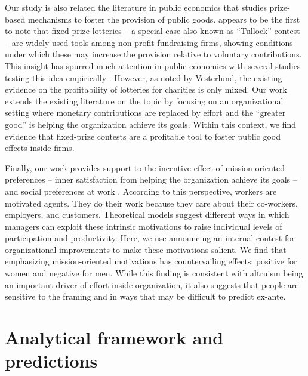\documentclass[12pt, titlepage]{article}
\begin{document}
Our study is also related the literature in public economics that
studies prize-based mechanisms to foster the provision of public goods.
\citet{morgan2000funding} appears to be the first to note that
fixed-prize lotteries -- a special case also known as ``Tullock''
contest -- are widely used tools among non-profit fundraising firms,
showing conditions under which these may increase the provision relative
to voluntary contributions. This insight has spurred much attention in
public economics with several studies testing this idea empirically
\citep[see][ for a survey]{vesterlund2012voluntary}. However, as noted
by Vesterlund, the existing evidence on the profitability of lotteries
for charities is only mixed. Our work extends the existing literature on
the topic by focusing on an organizational setting where monetary
contributions are replaced by effort and the ``greater good'' is helping
the organization achieve its goals. Within this context, we find
evidence that fixed-prize contests are a profitable tool to foster
public good effects inside firms.

Finally, our work provides support to the incentive effect of
mission-oriented preferences -- inner satisfaction from helping the
organization achieve its goals --
\citep{akerlof2005identity, besley2005competition, delfgaauw2005dedicated, delfgaauw2008incentives, prendergast2007motivation, rotemberg2006altruism}
and social preferences at work
\citep{bandiera2005social, bandiera2008social, bandiera2013team, dellavigna2016estimating}.
According to this perspective, workers are motivated agents. They do
their work because they care about their co-workers, employers, and
customers. Theoretical models suggest different ways in which managers
can exploit these intrinsic motivations to raise individual levels of
participation and productivity. Here, we use announcing an internal
contest for organizational improvements to make these motivations
salient. We find that emphasizing mission-oriented motivations has
countervailing effects: positive for women and negative for men. While
this finding is consistent with altruism being an important driver of
effort inside organization, it also suggests that people are sensitive
to the framing and in ways that may be difficult to predict ex-ante.

\section{Analytical framework and
predictions}\label{analytical-framework-and-predictions}
\end{document}
